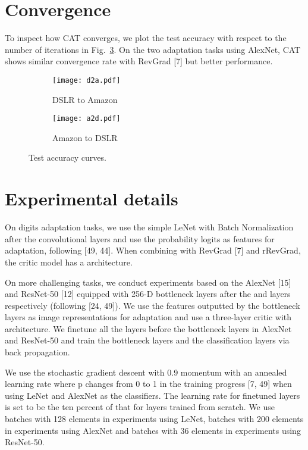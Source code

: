 \documentclass[10pt,twocolumn,letterpaper]{article}
\begin{document}
\section{Convergence}
To inspect how CAT converges, we plot the test accuracy with respect to the number of iterations in Fig.~\ref{fig:4}. On the two adaptation tasks using AlexNet, CAT shows similar convergence rate with RevGrad [7] but better performance.
\begin{figure}[t]
\centering
\begin{subfigure}{0.22\textwidth}
  \centering
  \texttt{[image: d2a.pdf]}
  \caption{DSLR to Amazon}
  \label{fig:4-1}
\end{subfigure}
\begin{subfigure}{0.22\textwidth}
  \centering
  \texttt{[image: a2d.pdf]}
  \caption{Amazon to DSLR}
  \label{fig:4-2}
\end{subfigure}
\vspace{-0.3cm}
\caption{Test accuracy curves.}\vspace{-0.6cm}
\label{fig:4}
\end{figure}



\section{Experimental details}
On digits adaptation tasks, we use the simple LeNet with Batch Normalization after the convolutional layers and use the probability logits as features for adaptation, following [49, 44]. When combining with RevGrad [7] and rRevGrad, the critic model has a  architecture.

On more challenging tasks, we conduct experiments based on the AlexNet [15] and ResNet-50 [12] equipped with 256-D bottleneck layers after the  and  layers respectively (following [24, 49]). We use the features outputted by the bottleneck layers as image representations for adaptation and use a three-layer critic with  architecture. We finetune all the layers before the bottleneck layers in AlexNet and ResNet-50 and train the bottleneck layers and the classification layers via back propagation.

We use the stochastic gradient descent with 0.9 momentum with an annealed learning rate  where p changes from 0 to 1 in the training progress [7, 49] when using LeNet and AlexNet as the classifiers. The learning rate for finetuned layers is set to be the ten percent of that for layers trained from scratch. We use batches with 128 elements in experiments using LeNet, batches with 200 elements in experiments using AlexNet and batches with 36 elements in experiments using ResNet-50.
\end{document}
